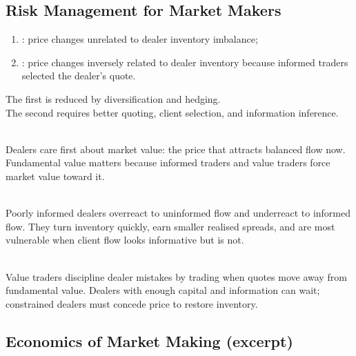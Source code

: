 \documentclass[a4paper,oneside,openany]{book}
\begin{document}
\subsection*{Risk Management for Market Makers}

\begin{taxonomy} 
\begin{enumerate}[label=\roman*.]
\setlength{\itemsep}{0pt}
\item {}: price changes unrelated to dealer inventory imbalance;
\item {}: price changes inversely related to dealer inventory because informed traders selected the dealer's quote.
\end{enumerate}
The first is reduced by diversification and hedging.\\
The second requires better quoting, client selection, and information inference.
\end{taxonomy}

\begin{principle} \\
Dealers care first about market value: the price that attracts balanced flow now. Fundamental value matters because informed traders and value traders force market value toward it.
\end{principle}

\begin{caveat} \\
Poorly informed dealers overreact to uninformed flow and underreact to informed flow. They turn inventory quickly, earn smaller realised spreads, and are most vulnerable when client flow looks informative but is not.
\end{caveat}

\begin{mechanism} \\
Value traders discipline dealer mistakes by trading when quotes move away from fundamental value. Dealers with enough capital and information can wait; constrained dealers must concede price to restore inventory.
\end{mechanism}

\subsection*{Economics of Market Making (excerpt)}
\end{document}
